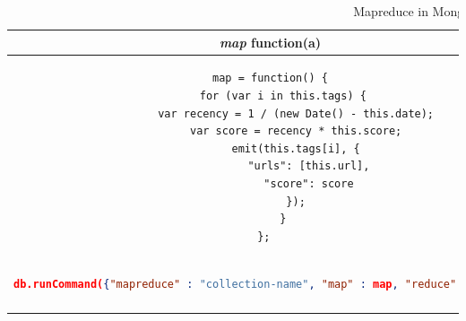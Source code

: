 \begin{longtable}{c|c}
	{\textit{map}} function(a) & {\textit{reduce}} function(b)\\
	\hline
	\begin{minipage}{.4\textwidth}
		\centering		
		\begin{lstlisting}[language=XML,basicstyle = \scriptsize,label=couchbase-map-sample]
map = function() {
	for (var i in this.tags) {
		var recency = 1 / (new Date() - this.date);
		var score = recency * this.score;
		emit(this.tags[i], {
			"urls": [this.url],
			"score": score
		});
	}
};	
		\end{lstlisting}		
	\end{minipage} &
	\begin{minipage}{.55\textwidth}
		\centering
		\begin{lstlisting}[language=JSON, basicstyle =\tiny, label=couchbase-reduce-sample]
reduce = function(key, emits) {
	var total = {urls: [],score: 0 }
	for (var i in emits) {
		emits[i].urls.forEach(function(url) {
			total.urls.push(url);
		}
		total.score += emits[i].score;
	}
	return total;
};
		\end{lstlisting}
	\end{minipage}\\
	\hline
	\begin{minipage}{.55\textwidth}
	\begin{lstlisting}[language=JSON, basicstyle =\tiny,]
        db.runCommand({"mapreduce" : "collection-name", "map" : map, "reduce" : reduce})
    \end{lstlisting}
	\end{minipage}\\
	\caption{Mapreduce in MongoDB}
	\label{mongdb-mapreduce}\\
\end{longtable}


